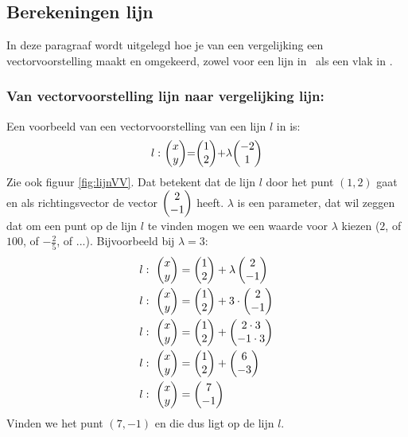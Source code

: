 
\subsection{Berekeningen lijn}
In deze paragraaf wordt uitgelegd hoe je van een vergelijking een vectorvoorstelling maakt en omgekeerd, zowel voor een lijn in \RT \ als een vlak in \RD. 

\subsubsection{Van vectorvoorstelling lijn naar vergelijking lijn:} 
Een voorbeeld van een  vectorvoorstelling van een lijn $l$ in \RT is: \[l:\ \vectwee{x}{y} = \vectwee{1}{2} + \lambda \vectwee{-2}{1} \] 
Zie ook figuur \ref{fig:lijnVV}. Dat betekent dat de lijn $l$ door het punt $(1,2)$ gaat en als richtingsvector de vector $ \vectwee {2}{-1} $ heeft. $\lambda$ is een parameter, dat wil zeggen dat om een punt op de lijn $l$ te vinden mogen we een waarde voor $\lambda $ kiezen ($2$, of $100$, of $-\frac{2}{5}$, of ...). Bijvoorbeeld bij  $\lambda=3$: 
\begin{align*}
  l: \ \begin{pmatrix} x \\ y \end{pmatrix} &= \begin{pmatrix} 1 \\ 2 \end{pmatrix}  + \lambda  \begin{pmatrix} 2 \\ -1 \end{pmatrix}  \\
  l: \ \begin{pmatrix} x \\ y \end{pmatrix} &= \begin{pmatrix} 1 \\ 2 \end{pmatrix}  + 3 \cdot \begin{pmatrix} 2 \\ -1 \end{pmatrix}  \\
  l: \ \begin{pmatrix} x \\ y \end{pmatrix} &= \begin{pmatrix} 1 \\ 2 \end{pmatrix}  + \begin{pmatrix} 2\cdot 3 \\ -1\cdot 3 \end{pmatrix}  \\
  l: \ \begin{pmatrix} x \\ y \end{pmatrix} &= \begin{pmatrix} 1 \\ 2 \end{pmatrix}  + \begin{pmatrix} 6 \\ -3 \end{pmatrix}  \\
  l: \ \begin{pmatrix} x \\ y \end{pmatrix} &= \begin{pmatrix} 7 \\ -1 \end{pmatrix}
\end{align*}
Vinden we het punt $(7,-1)$ en die dus ligt op de lijn $l$.

